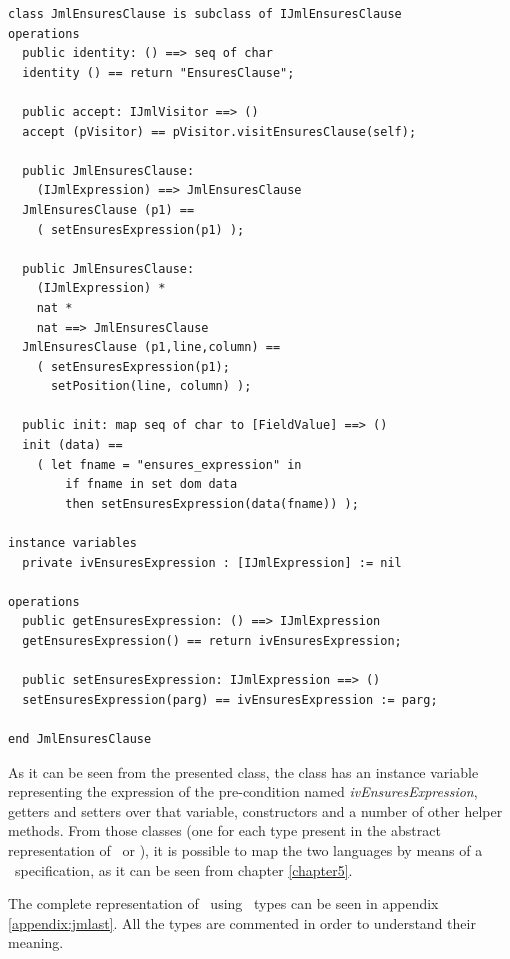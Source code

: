 \bigskip
\lstset{style=Example}
\begin{lstlisting}
class JmlEnsuresClause is subclass of IJmlEnsuresClause
operations
  public identity: () ==> seq of char
  identity () == return "EnsuresClause";

  public accept: IJmlVisitor ==> ()
  accept (pVisitor) == pVisitor.visitEnsuresClause(self);

  public JmlEnsuresClause:
    (IJmlExpression) ==> JmlEnsuresClause
  JmlEnsuresClause (p1) == 
    ( setEnsuresExpression(p1) );

  public JmlEnsuresClause:
    (IJmlExpression) *
    nat *
    nat ==> JmlEnsuresClause
  JmlEnsuresClause (p1,line,column) == 
    ( setEnsuresExpression(p1);
      setPosition(line, column) );

  public init: map seq of char to [FieldValue] ==> ()
  init (data) ==
    ( let fname = "ensures_expression" in
        if fname in set dom data
        then setEnsuresExpression(data(fname)) );

instance variables
  private ivEnsuresExpression : [IJmlExpression] := nil

operations
  public getEnsuresExpression: () ==> IJmlExpression
  getEnsuresExpression() == return ivEnsuresExpression;

  public setEnsuresExpression: IJmlExpression ==> ()
  setEnsuresExpression(parg) == ivEnsuresExpression := parg;

end JmlEnsuresClause
\end{lstlisting}

\bigskip

As it can be seen from the presented class, the class has an instance variable representing the expression of the pre-condition named \textit{ivEnsuresExpression}, getters and setters over that variable, constructors and a number of other helper methods. From those classes (one for each type present in the abstract representation of \vpp\ or \jml), it is possible to map the two languages by means of a \vpp\ specification, as it can be seen from chapter \ref{chapter5}.

The complete representation of \jml\ using \vdm\ types can be seen in appendix \ref{appendix:jmlast}. All the types are commented in order to understand their meaning. 


